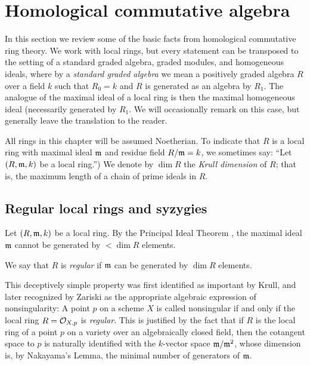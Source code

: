\section{Homological commutative algebra} 



In this section we review some of the basic facts from homological commutative ring theory. We work
with local rings, but every statement can be transposed to the setting of a standard graded algebra, graded modules, and homogeneous ideals, where by a \emph{standard graded algebra} we mean a positively graded algebra $R$ over a field $k$ such that $R_{0} = k$ and $R$ is generated as an algebra by $R_{1}$. The analogue of the maximal ideal of a local ring is then the maximal homogeneous ideal (necessarily generated by $R_{1}$. We will occasionally remark on this case, but generally leave the translation to the reader.

All rings in this chapter will be assumed Noetherian. To indicate that $R$ is a local ring with maximal ideal $\mathfrak m$ and residue field $R/\mathfrak m = k$, we sometimes  say: ``Let $(R,\mathfrak m,k)$ be a local ring.'') We denote by $\dim R$ the \emph{Krull dimension} of $R$; that is, the maximum length of a chain of prime ideals in $R$.

\subsection{Regular local rings and syzygies}
Let $(R,\mathfrak m,k)$ be a local ring. By the Principal Ideal Theorem \cite[]{E}, the maximal ideal $\mathfrak m$ cannot be generated by  $<\dim R$ elements.

\begin{definition}
 We say that $R$ is \emph{regular} if $\mathfrak m$ can be generated by $\dim R$ elements.
\end{definition}

This deceptively simple property was first identified as important by Krull, and later recognized by Zariski as the appropriate algebraic expression of nonsingularity: A point $p$ on a scheme $X$ is called nonsingular if and only if the local ring $R = {\mathcal O}_{X,p}$ is \emph{regular}. This is justified by the fact that if $R$ is the local ring of a point $p$ on a variety over an algebraically closed field, then the cotangent space to $p$ is naturally identified with the 
$k$-vector space $\mathfrak m/\mathfrak m^{2}$, whose dimension is, by Nakayama's Lemma, the minimal number of generators of $\mathfrak m$. 

